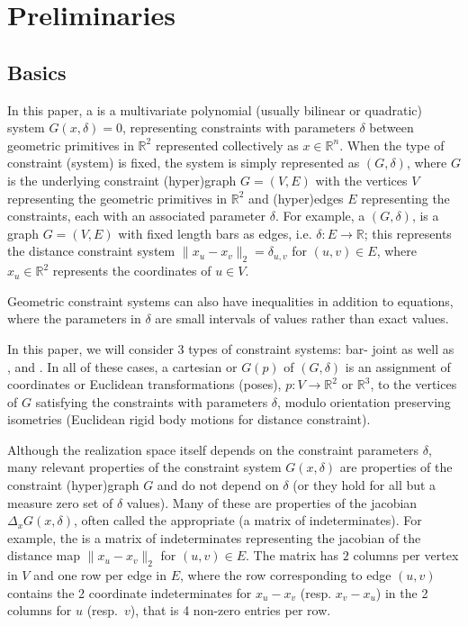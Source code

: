 \section{Preliminaries}
\label{sec:prelim}
%
\subsection{Basics}
%
In this paper, a  is a multivariate
polynomial (usually bilinear or quadratic) system $G(x,\delta)=0$,
representing constraints with parameters $\delta$ between geometric
primitives  in $\mathbb{R}^2$ represented collectively as $x\in
\mathbb{R}^n$.
%
When the type of constraint (system) is fixed, the system is simply
represented as $(G,\delta)$, where $G$ is the underlying constraint
(hyper)graph $G = (V,E)$ with the vertices $V$ representing the
geometric primitives in $\mathbb{R}^2$ and (hyper)edges $E$
representing the constraints, each with an associated parameter
$\delta$.
%
For example, a  $(G,\delta)$, is a
graph $G=(V,E)$ with fixed length bars as edges, i.e. $\delta: E
\rightarrow \mathbb{R}$; this represents the distance constraint
system $\| x_u -x_v \|_2 = \delta_{u,v}$ for  $(u,v) \in E$, where
$x_u \in \mathbb{R}^2$ represents the coordinates of $u\in V$.

\noindent
\note Geometric constraint systems can also have
inequalities in addition to equations, where the parameters in $\delta$ are small intervals of
values rather than exact values.

In this paper, we will consider 3 types of constraint systems: bar-
joint as well as , and .
In all of these cases, a cartesian  or 
$G(p)$ of $(G,\delta)$ is an assignment of coordinates or Euclidean
transformations (poses), $p: V \rightarrow \mathbb{R}^2$ or
$\mathbb{R}^3$, to the vertices of $G$ satisfying the constraints with
parameters $\delta$, modulo orientation preserving isometries
(Euclidean rigid body motions for distance constraint).

Although the realization space itself depends on the constraint
parameters $\delta$, many relevant  properties of the
constraint system $G(x,\delta)$ are properties of the constraint
(hyper)graph $G$ and do not depend on $\delta$ (or they hold for all
but a measure zero set of $\delta$ values). Many of these are
properties of the jacobian $\Delta_x G(x,\delta)$, often called the
appropriate  (a matrix of indeterminates).
For example, the  is a matrix of indeterminates representing the jacobian of the
distance map $\| x_u -x_v \|_2$  for $(u,v) \in E$. The matrix has $2$
columns per vertex in $V$ and one row per edge in $E$, where the row
corresponding to edge $(u,v)$ contains the 2 coordinate indeterminates
for $x_u -x_v$ (resp. $x_v-x_u$) in the 2 columns for $u$ (resp.\
$v$), that is 4 non-zero entries per row.


